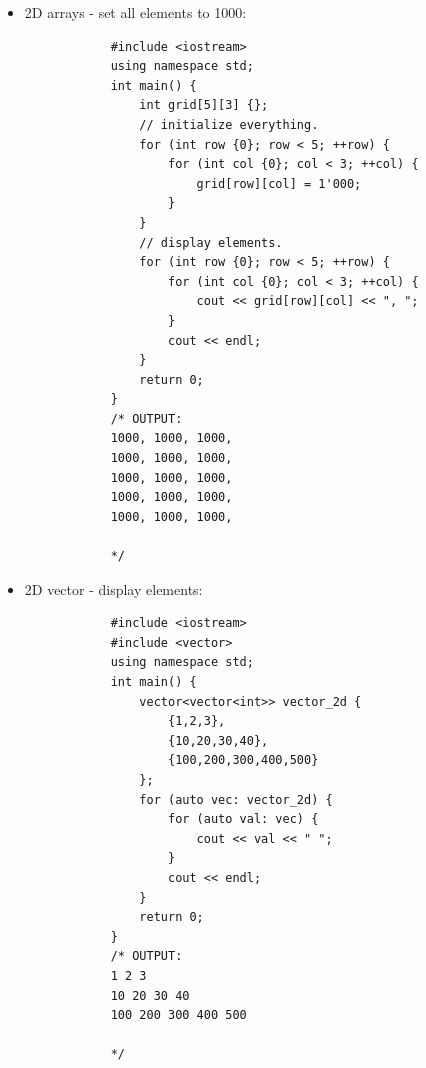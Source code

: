 \begin{itemize}
\begin{verbatim}
            */
        \end{verbatim}
    
    \item 2D arrays - set all elements to 1000:
        \begin{verbatim}
            #include <iostream>
            using namespace std;
            int main() {
                int grid[5][3] {};
                // initialize everything.
                for (int row {0}; row < 5; ++row) {
                    for (int col {0}; col < 3; ++col) {
                        grid[row][col] = 1'000;
                    }
                }
                // display elements.
                for (int row {0}; row < 5; ++row) {
                    for (int col {0}; col < 3; ++col) {
                        cout << grid[row][col] << ", ";
                    }
                    cout << endl;
                }
                return 0;
            }
            /* OUTPUT:
            1000, 1000, 1000,
            1000, 1000, 1000,
            1000, 1000, 1000,
            1000, 1000, 1000,
            1000, 1000, 1000,

            */
        \end{verbatim}
    
    \item 2D vector - display elements:
        \begin{verbatim}
            #include <iostream>
            #include <vector>
            using namespace std;
            int main() {
                vector<vector<int>> vector_2d {
                    {1,2,3},
                    {10,20,30,40},
                    {100,200,300,400,500}
                };
                for (auto vec: vector_2d) {
                    for (auto val: vec) {
                        cout << val << " ";
                    }
                    cout << endl;
                }
                return 0;
            }
            /* OUTPUT:
            1 2 3
            10 20 30 40
            100 200 300 400 500

            */
        \end{verbatim}
\end{itemize}
